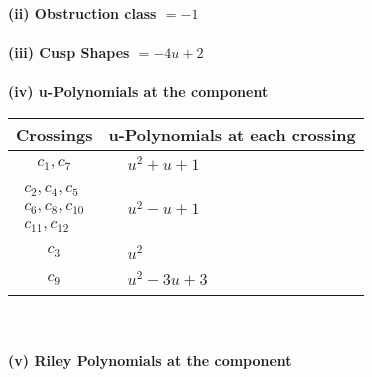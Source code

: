 \documentclass[1p]{elsarticle_modified}
\theoremstyle{definition}
\begin{document}
\flushleft \textbf{(ii) Obstruction class $= -1$}\\~\\
\flushleft \textbf{(iii) Cusp Shapes $= -4 u+2$}\\~\\
\newpage\renewcommand{\arraystretch}{1}
\flushleft \textbf{(iv) u-Polynomials at the component}\newline \\
\begin{tabular}{m{50pt}|m{274pt}}
Crossings & \hspace{64pt}u-Polynomials at each crossing \\
\hline $$\begin{aligned}c_{1},c_{7}\end{aligned}$$&$\begin{aligned}
&u^2+u+1
\end{aligned}$\\
\hline $$\begin{aligned}c_{2},c_{4},c_{5}\\c_{6},c_{8},c_{10}\\c_{11},c_{12}\end{aligned}$$&$\begin{aligned}
&u^2- u+1
\end{aligned}$\\
\hline $$\begin{aligned}c_{3}\end{aligned}$$&$\begin{aligned}
&u^2
\end{aligned}$\\
\hline $$\begin{aligned}c_{9}\end{aligned}$$&$\begin{aligned}
&u^2-3 u+3
\end{aligned}$\\
\hline
\end{tabular}\\~\\
\newpage\renewcommand{\arraystretch}{1}
\flushleft \textbf{(v) Riley Polynomials at the component}\newline \\
\end{document}
